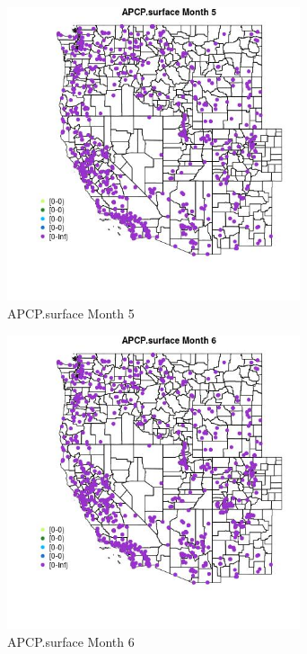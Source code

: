 \begin{figure} 
\centering  
\includegraphics[width=0.77\textwidth]{Code_Outputs/Report_ML_input_PM25_Step4_part_f_de_duplicated_aves_prioritize_24hr_obswNAs_MapObsMo5APCPsurface.jpg} 
\caption{\label{fig:Report_ML_input_PM25_Step4_part_f_de_duplicated_aves_prioritize_24hr_obswNAsMapObsMo5APCPsurface}APCP.surface Month 5} 
\end{figure} 
 

\begin{figure} 
\centering  
\includegraphics[width=0.77\textwidth]{Code_Outputs/Report_ML_input_PM25_Step4_part_f_de_duplicated_aves_prioritize_24hr_obswNAs_MapObsMo6APCPsurface.jpg} 
\caption{\label{fig:Report_ML_input_PM25_Step4_part_f_de_duplicated_aves_prioritize_24hr_obswNAsMapObsMo6APCPsurface}APCP.surface Month 6} 
\end{figure} 
 

